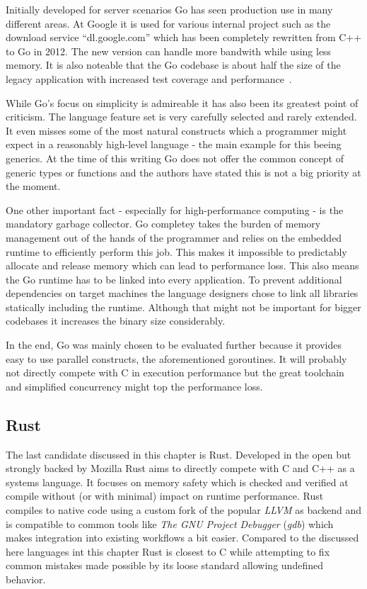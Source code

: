 Initially developed for server scenarios Go has seen production use in many different areas. At Google it is used for various internal project such as the download service ``dl.google.com'' which has been completely rewritten from C++ to Go in 2012. The new version can handle more bandwith while using less memory. It is also noteable that the Go codebase is about half the size of the legacy application with increased test coverage and performance~\cite{go_dl_google}.

While Go's focus on simplicity is admireable it has also been its greatest point of criticism. The language feature set is very carefully selected and rarely extended. It even misses some of the most natural constructs which a programmer might expect in a reasonably high-level language - the main example for this beeing generics. At the time of this writing Go does not offer the common concept of generic types or functions and the authors have stated this is not a big priority at the moment.

One other important fact - especially for high-performance computing - is the mandatory garbage collector. Go completey takes the burden of memory management out of the hands of the programmer and relies on the embedded runtime to efficiently perform this job. This makes it impossible to predictably allocate and release memory which can lead to performance loss. This also means the Go runtime has to be linked into every application. To prevent additional dependencies on target machines the language designers chose to link all libraries statically including the runtime. Although that might not be important for bigger codebases it increases the binary size considerably.

In the end, Go was mainly chosen to be evaluated further because it provides easy to use parallel constructs, the aforementioned \glspl{goroutine}. It will probably not directly compete with C in execution performance but the great toolchain and simplified concurrency might top the performance loss.

\subsection*{Rust}
\label{subsec:State_of_the_art::Candidates::Rust}

The last candidate discussed in this chapter is Rust. Developed in the open but strongly backed by Mozilla Rust aims to directly compete with C and C++ as a systems language. It focuses on memory safety which is checked and verified at compile without (or with minimal) impact on runtime performance. Rust compiles to native code using a custom fork of the popular \textit{LLVM} as backend and is compatible to common tools like \textit{The GNU Project Debugger} (\textit{gdb}) which makes integration into existing workflows a bit easier. Compared to the discussed here languages int this chapter Rust is closest to C while attempting to fix common mistakes made possible by its loose standard allowing undefined behavior.

